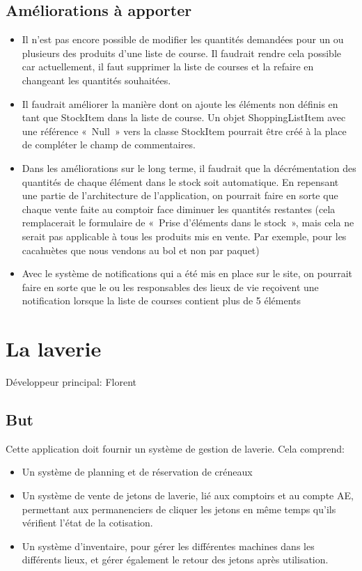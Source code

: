 \documentclass[a4paper]{report}
\begin{document}
\section{Améliorations à apporter}
\label{sec:amelioration_a_apporter}

\begin{itemize}
    \item Il n'est pas encore possible de modifier les quantités demandées pour un ou plusieurs des produits d'une liste
        de course. Il faudrait rendre cela possible car actuellement, il faut supprimer la liste de courses et la
        refaire en changeant les quantités souhaitées.
    \item Il faudrait améliorer la manière dont on ajoute les éléments non définis en tant que StockItem dans la liste
        de course. Un objet ShoppingListItem avec une référence « Null » vers la classe StockItem pourrait être créé à
        la place de compléter le champ de commentaires.
    \item Dans les améliorations sur le long terme, il faudrait que la décrémentation des quantités de chaque élément
        dans le stock soit automatique. En repensant une partie de l'architecture de l'application, on pourrait faire en
        sorte que chaque vente faite au comptoir face diminuer les quantités restantes (cela remplacerait le formulaire
        de « Prise d'éléments dans le stock », mais cela ne serait pas applicable à tous les produits mis en vente. Par
        exemple, pour les cacahuètes que nous vendons au bol et non par paquet)
    \item Avec le système de notifications qui a été mis en place sur le site, on pourrait faire en sorte que le ou les
        responsables des lieux de vie reçoivent une notification lorsque la liste de courses contient plus de 5 éléments
\end{itemize}


\chapter{La laverie}
\label{sec:la_laverie}
\par Développeur principal: Florent

\section{But}
\label{sub:but}
\par Cette application doit fournir un système de gestion de laverie. Cela comprend:
\begin{itemize}
    \item Un système de planning et de réservation de créneaux
    \item Un système de vente de jetons de laverie, lié aux comptoirs et au compte AE, permettant aux permanenciers de
        cliquer les jetons en même temps qu'ils vérifient l'état de la cotisation.
    \item Un système d'inventaire, pour gérer les différentes machines dans les différents lieux, et gérer également le
        retour des jetons après utilisation.
\end{itemize}
\end{document}
